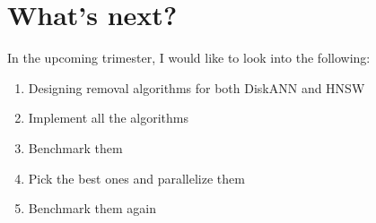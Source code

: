 \chapter{What's next?}

In the upcoming trimester, I would like to look into the following:
\begin{enumerate}
    \item Designing removal algorithms for both DiskANN and HNSW
    \item Implement all the algorithms
    \item Benchmark them
    \item Pick the best ones and parallelize them
    \item Benchmark them again
\end{enumerate}
